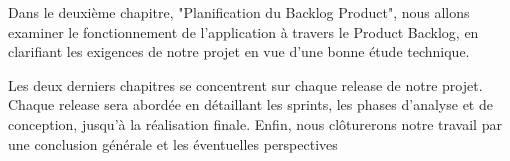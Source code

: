 \medskip
Dans le deuxième chapitre, "Planification du Backlog Product", nous allons examiner le fonctionnement de l'application à travers  le Product Backlog, en clarifiant les exigences de notre projet en vue d'une bonne étude technique.

\medskip
Les deux derniers chapitres se concentrent sur chaque release de notre projet. Chaque release sera abordée en détaillant les sprints, les phases d'analyse et de conception, jusqu'à la réalisation finale.
\medskip
Enfin, nous clôturerons notre travail par une conclusion générale et les éventuelles perspectives
\vspace{1cm}



